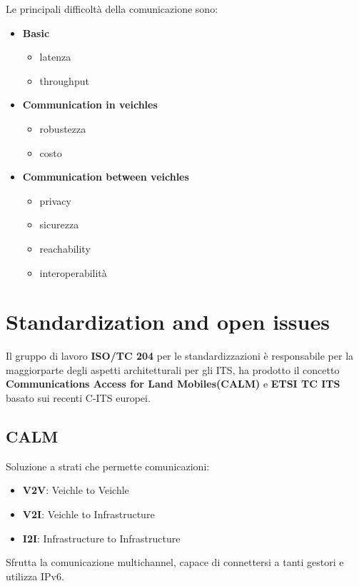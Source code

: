 Le principali difficoltà della comunicazione sono:
\begin{itemize}
  \item \textbf{Basic}
  \begin{itemize}
    \item latenza
    \item throughput
  \end{itemize}
  \item \textbf{Communication in veichles}
  \begin{itemize}
    \item robustezza
    \item costo
  \end{itemize}
  \item \textbf{Communication between veichles}
  \begin{itemize}
    \item privacy
    \item sicurezza
    \item reachability
    \item interoperabilità
  \end{itemize}
\end{itemize}





\section{Standardization and open issues}

Il gruppo di lavoro \textbf{ISO/TC 204} per le standardizzazioni è responsabile per la maggiorparte degli aspetti architetturali per gli ITS, ha prodotto il concetto \textbf{Communications Access for Land Mobiles(CALM)} e \textbf{ETSI TC ITS} basato sui recenti C-ITS europei.



\subsection{CALM}
Soluzione a strati che permette comunicazioni:
\begin{itemize}
  \item \textbf{V2V}: Veichle to Veichle
  \item \textbf{V2I}: Veichle to Infrastructure
  \item \textbf{I2I}: Infrastructure to Infrastructure
\end{itemize}

Sfrutta la comunicazione multichannel, capace di connettersi a tanti gestori e utilizza IPv6. 

